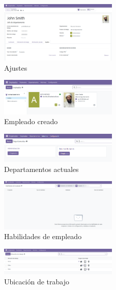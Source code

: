 \documentclass[a4paper,12pt]{article}
\begin{document}
\begin{figure}[h!]
    \centering
    \includegraphics[width=0.5\textwidth]{pr2odoo17-ajustes.png}
    \caption{Ajustes}
\end{figure}
\FloatBarrier

\begin{figure}[h!]
    \centering
    \includegraphics[width=0.5\textwidth]{pr2odoo18-empleadoCreado.png}
    \caption{Empleado creado}
\end{figure}
\FloatBarrier

\begin{figure}[h!]
    \centering
    \includegraphics[width=0.5\textwidth]{pr2odoo19-departamentos.png}
    \caption{Departamentos actuales}
\end{figure}
\FloatBarrier

\begin{figure}[h!]
    \centering
    \includegraphics[width=0.5\textwidth]{pr2odoo20-habilidadesDeEmpleado.png}
    \caption{Habilidades de empleado}
\end{figure}
\FloatBarrier

\begin{figure}[h!]
    \centering
    \includegraphics[width=0.5\textwidth]{pr2odoo21-ubicacionDeTrabajo.png}
    \caption{Ubicación de trabajo}
\end{figure}
\FloatBarrier
\end{document}
